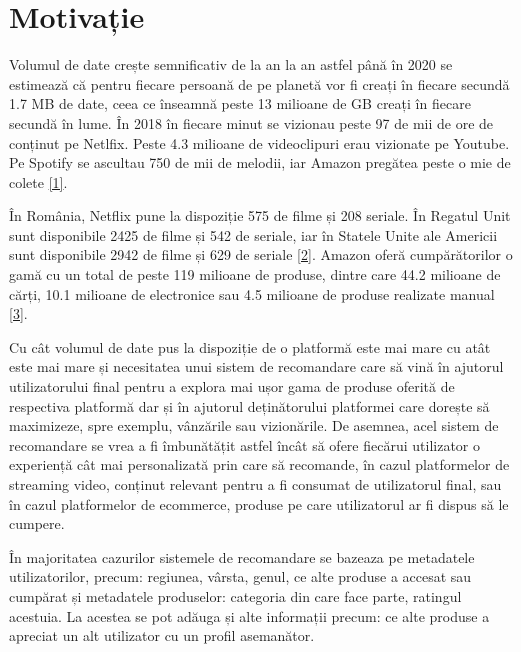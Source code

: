 \section{Motivație}

Volumul de date crește semnificativ de la an la an astfel până în 2020 se estimează că pentru fiecare persoană de pe planetă vor fi creați în fiecare secundă 1.7 MB de date, ceea ce înseamnă peste 13 milioane de GB creați în fiecare secundă în lume. În 2018 în fiecare minut se vizionau peste 97 de mii de ore de conținut pe Netlfix. Peste 4.3 milioane de videoclipuri erau vizionate pe Youtube. Pe Spotify se ascultau 750 de mii de melodii, iar Amazon pregătea peste o mie de colete \hyperlink{domo}{[1]}.

În România, Netflix pune la dispoziție 575 de filme și 208 seriale. În Regatul Unit sunt disponibile 2425 de filme și 542 de seriale, iar în Statele Unite ale Americii sunt disponibile 2942 de filme și 629 de seriale \hyperlink{finder}{[2]}. Amazon oferă cumpărătorilor o gamă cu un total de peste 119 milioane de produse, dintre care 44.2 milioane de cărți, 10.1 milioane de electronice sau 4.5 milioane de produse realizate manual \hyperlink{scrapehero}{[3]}.

Cu cât volumul de date pus la dispoziție de o platformă este mai mare cu atât este mai mare și necesitatea unui sistem de recomandare care să vină în ajutorul utilizatorului final pentru a explora mai ușor gama de produse oferită de respectiva platformă dar și în ajutorul deținătorului platformei care dorește să maximizeze, spre exemplu, vânzările sau vizionările. De asemnea, acel sistem de recomandare se vrea a fi îmbunătățit astfel încât să ofere fiecărui utilizator o experiență cât mai personalizată prin care să recomande, în cazul platformelor de streaming video, conținut relevant pentru a fi consumat de utilizatorul final, sau în cazul platformelor de ecommerce, produse pe care utilizatorul ar fi dispus să le cumpere.

În majoritatea cazurilor sistemele de recomandare se bazeaza pe metadatele utilizatorilor, precum: regiunea, vârsta, genul, ce alte produse a accesat sau cumpărat și metadatele produselor: categoria din care face parte, ratingul acestuia. La acestea se pot adăuga și alte informații precum: ce alte produse a apreciat un alt utilizator cu un profil asemanător.

